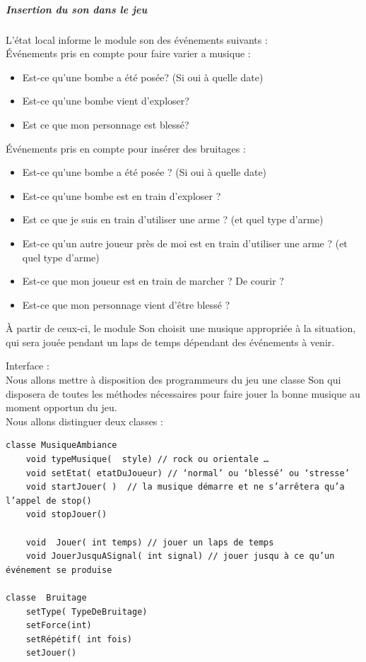 \documentclass[a4paper,10pt]{article}
\begin{document}
\subparagraph{Insertion du son dans le jeu}

L'état local informe le module son des événements suivants : \\


Événements pris en compte pour faire varier a musique :
\begin{itemize}
\item Est-ce qu'une bombe a été posée? (Si oui à quelle date)
\item Est-ce qu'une bombe vient d'exploser?
\item Est ce que mon personnage est blessé?
\end{itemize}

Événements pris en compte pour insérer des bruitages :
\begin{itemize}
\item Est-ce qu'une bombe a été posée ? (Si oui à quelle date)
\item Est-ce qu'une bombe est en train d'exploser ?
\item Est ce que je suis en train d'utiliser une arme ? (et quel type d'arme)
\item Est-ce qu'un autre joueur près de moi est en train d'utiliser une arme ? (et quel type d'arme)
\item Est-ce que mon joueur est en train de marcher ? De courir ?
\item Est-ce que mon personnage vient d'être blessé ?

\end{itemize}
À partir de ceux-ci, le module Son choisit une musique appropriée à la situation, qui sera jouée pendant un laps de temps dépendant des événements à venir. 


Interface :\\

Nous allons mettre à disposition des programmeurs du jeu une classe Son qui disposera de toutes les méthodes nécessaires pour faire jouer la bonne musique au moment opportun du jeu. \\

Nous allons distinguer deux classes :\\
\begin{verbatim}
classe MusiqueAmbiance
	void typeMusique(  style) // rock ou orientale …
	void setEtat( etatDuJoueur) // ‘normal’ ou ‘blessé’ ou ‘stresse’
	void startJouer( )  // la musique démarre et ne s’arrêtera qu’a l’appel de stop()
	void stopJouer()

	void  Jouer( int temps) // jouer un laps de temps
	void JouerJusquASignal( int signal) // jouer jusqu à ce qu’un événement se produise

classe  Bruitage
	setType( TypeDeBruitage)
	setForce(int)
	setRépétif( int fois)
	setJouer()
\end{verbatim}
\end{document}
